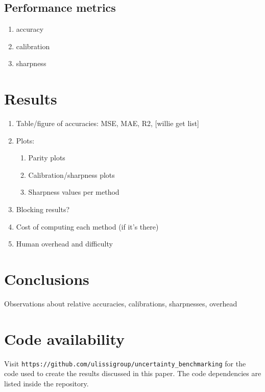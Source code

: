 \documentclass[]{achemso}
\begin{document}
\subsection{Performance metrics}

\begin{enumerate}
    \item{accuracy}
    \item{calibration}
    \item{sharpness}
\end{enumerate}



\section{Results}

\begin{enumerate}
    \item{Table/figure of accuracies: MSE, MAE, R2, [willie get list]}
    \item{Plots:}
        \begin{enumerate}
            \item{Parity plots}
            \item{Calibration/sharpness plots}
            \item{Sharpness values per method}
        \end{enumerate}
    \item{Blocking results?}
    \item{Cost of computing each method (if it’s there)}
    \item{Human overhead and difficulty}
\end{enumerate}



\section{Conclusions}

Observations about relative accuracies, calibrations, sharpnesses, overhead



\section*{Code availability} Visit \texttt{https://github.com/ulissigroup/uncertainty\_benchmarking} for the code used to create the results discussed in this paper.
The code dependencies are listed inside the repository.
\end{document}
